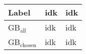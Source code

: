 \begin{tabular}{lll}
    \hline
    Label & idk & idk \\
    \hline
    GB$_\text{all}$ & idk & idk \\
    GB$_\text{chosen}$ & idk & idk \\
\end{tabular}
